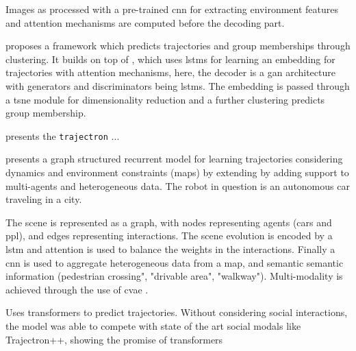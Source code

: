 Images as processed with a pre-trained \gls{cnn} for extracting environment features and attention mechanisms are computed before the decoding part.



\cite{fernando2019gd} proposes a framework which predicts trajectories and group memberships through clustering.
%
It builds on top of \cite{fernando2018soft+}, which uses \glspl{lstm} for learning an embedding for trajectories with attention mechanisms, here, the decoder is a \gls{gan} architecture with generators and discriminators being \glspl{lstm}.
%
The embedding is passed through a \gls{tsne} module for dimensionality reduction and a further clustering predicts group membership. 


\cite{ivanovic2019trajectron} presents the \texttt{trajectron} ...


\cite{salzmann2020trajectron++}  presents a graph structured recurrent model for learning trajectories considering dynamics and environment constraints (maps) by extending \cite{ivanovic2019trajectron} by adding support to multi-agents and heterogeneous data. The robot in question is an autonomous car traveling in a city.

The scene is represented as a graph, with nodes representing agents (cars and ppl), and edges representing interactions.
%
The scene evolution is encoded by a \gls{lstm} and attention is used to balance the weights in the interactions.
%
Finally a \gls{cnn} is used to aggregate heterogeneous data from a map, and semantic semantic information (pedestrian crossing", "drivable area", "walkway"). 
%
Multi-modality is achieved through the use of \gls{cvae} .


\cite{giuliari2020transformer} Uses transformers to predict trajectories. Without considering social interactions, the model was able to compete with state of the art social modals like Trajectron++, showing the promise of transformers


